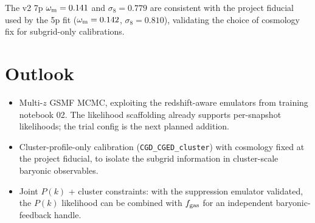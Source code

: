\documentclass{article}
\begin{document}
The v2 7p $\omega_{\rm m}=0.141$ and $\sigma_8=0.779$ are consistent
with the project fiducial used by the 5p fit ($\omega_{\rm m}=0.142$,
$\sigma_8=0.810$), validating the choice of cosmology fix for
subgrid-only calibrations.

\FloatBarrier

\section{Outlook}

\begin{itemize}
  \item Multi-$z$ GSMF MCMC, exploiting the redshift-aware emulators
        from training notebook 02. The likelihood scaffolding already
        supports per-snapshot likelihoods; the trial config is the
        next planned addition.
  \item Cluster-profile-only calibration
        (\texttt{CGD\_CGED\_cluster}) with cosmology fixed at the
        project fiducial, to isolate the subgrid information in
        cluster-scale baryonic observables.
  \item Joint $P(k)$ + cluster constraints: with the suppression
        emulator validated, the $P(k)$ likelihood can be combined with
        $f_{\rm gas}$ for an independent baryonic-feedback handle.
\end{itemize}
\end{document}
